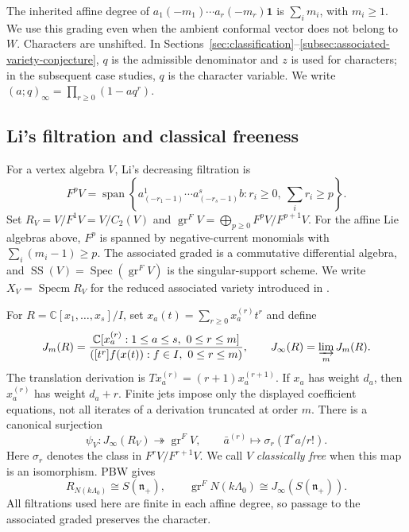 \documentclass[11pt]{amsart}
\theoremstyle{definition}
\theoremstyle{remark}
\newcommand{\C}{\mathbb C}
\newcommand{\n}{\mathfrak n_+}
\newcommand{\vac}{\mathbf1}
\newcommand{\J}{J_\infty}
\DeclareMathOperator{\gr}{gr}
\DeclareMathOperator{\Spec}{Spec}
\newcommand{\SingSupp}{\operatorname{SS}}
\begin{document}
The inherited affine degree of
$a_1(-m_1)\cdots a_r(-m_r)\vac$ is $\sum_i m_i$, with $m_i\ge1$.
We use this grading even when the ambient conformal vector does not
belong to $W$. Characters are unshifted. In
Sections~\ref{sec:classification}--\ref{subsec:associated-variety-conjecture},
$q$ is the admissible denominator and $z$ is used for characters;
in the subsequent case studies, $q$ is the character variable.
We write $(a;q)_\infty=\prod_{r\ge0}(1-aq^r)$.

\subsection{Li's filtration and classical freeness}
For a vertex algebra $V$, Li's decreasing filtration is
\[
 F^pV=\operatorname{span}\left\{
 a^1_{(-r_1-1)}\cdots a^s_{(-r_s-1)}b:
 r_i\ge0,\ \sum_i r_i\ge p\right\}.
\]
Set $R_V=V/F^1V=V/C_2(V)$ and
$\gr^F V=\bigoplus_{p\ge0}F^pV/F^{p+1}V$.
For the affine Lie algebras above, $F^p$ is spanned by negative-current
monomials with $\sum_i(m_i-1)\ge p$.
The associated graded is a commutative differential algebra, and
$\SingSupp(V)=\Spec(\gr^F V)$ is the singular-support scheme.
We write $X_V=\operatorname{Specm}R_V$ for the reduced associated variety introduced in \cite{Ar}.

For $R=\C[x_1,\ldots,x_s]/I$, set
$x_a(t)=\sum_{r\ge0}x_a^{(r)}t^r$ and define
\begin{equation}\label{eq:jet-definition}
 J_m(R)=\frac{\C[x_a^{(r)}:1\le a\le s,\ 0\le r\le m]}
 {([t^r]f(x(t)):f\in I,\ 0\le r\le m)},\qquad
 \J(R)=\varinjlim_mJ_m(R).
\end{equation}
The translation derivation is $Tx_a^{(r)}=(r+1)x_a^{(r+1)}$.
If $x_a$ has weight $d_a$, then $x_a^{(r)}$ has weight $d_a+r$.
Finite jets impose only the displayed coefficient equations, not all
iterates of a derivation truncated at order $m$.
There is a canonical surjection
\begin{equation}\label{eq:canonical}
 \psi_V:\J(R_V)\twoheadrightarrow\gr^F V,
 \qquad \bar a^{(r)}\longmapsto\sigma_r(T^ra/r!).
\end{equation}
Here $\sigma_r$ denotes the class in $F^rV/F^{r+1}V$.
We call $V$ \emph{classically free} when this map is an isomorphism.
PBW gives
\begin{equation}\label{eq:universal-pbw}
 R_{N(k\Lambda_0)}\cong S(\n),\qquad
 \gr^F N(k\Lambda_0)\cong\J(S(\n)).
\end{equation}
All filtrations used here are finite in each affine degree, so passage
to the associated graded preserves the character.
\end{document}
